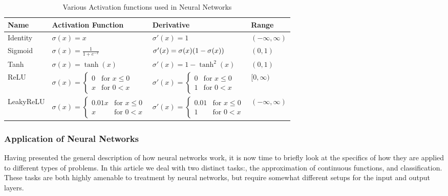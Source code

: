 \documentclass[reprint, english, nofootinbib]{revtex4-2}
\begin{document}
\begin{table}[]
\caption{\label{tab: activation functions}Various Activation functions used in Neural Networks}
\setlength{\tabcolsep}{20pt}
\renewcommand{\arraystretch}{2.5}
\begin{tabular}{llll}
    Name & Activation Function & Derivative & Range \\
    \hline\hline
    Identity &
    $\sigma(x) = x$  &
    $\sigma'(x) = 1$ &
    $(-\infty, \infty)$
    \\ \hline
    Sigmoid &
    $\sigma(x) = \frac{1}{1 + e^{-x}}$  &
    $\sigma'(x) =\sigma(x)\qty(1-\sigma(x))$ &
    $(0, 1)$
    \\ \hline
    Tanh &
    $\sigma(x) = \tanh(x)$  &
    $\sigma'(x) =  1 - \tanh^2(x)$ &
    $(0, 1)$
    \\ \hline
    ReLU    &
    $\sigma(x) = \left\{\begin{matrix}0 & \text{for } x \leq 0 \\ x & \text{for } 0 < x\end{matrix}\right.$ &
    $\sigma'(x) = \left\{\begin{matrix}0 & \text{for } x \leq 0 \\ 1 & \text{for } 0 < x\end{matrix}\right.$ &
    $[0, \infty)$
    \\ \hline
    LeakyReLU &
    $\sigma(x) = \left\{\begin{matrix}0.01x & \text{for } x \leq 0 \\ x & \text{for } 0 < x\end{matrix}\right.$ &
    $\sigma'(x) = \left\{\begin{matrix}0.01 & \text{for } x \leq 0 \\ 1 & \text{for } 0 < x\end{matrix}\right.$ &
    $(-\infty, \infty)$
    \\ \hline
\end{tabular}
\end{table}



\subsubsection{Application of Neural Networks}

Having presented the general description of how neural networks work, it is now time to briefly look at the specifics of how they are applied to different types of problems. In this article we deal with two distinct tasks:, the approximation of continuous functions, and classification. These tasks are both highly amenable to treatment by neural networks, but require somewhat different setups for the input and output layers.
\end{document}
